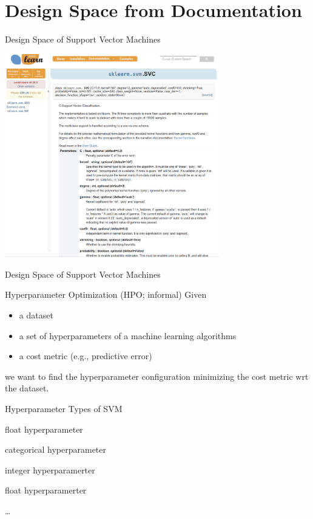 \section{Design Space from Documentation}
\begin{frame}[c]{Design Space of Support Vector Machines}

\centering
\includegraphics[width=0.7\textwidth]{images/sklearn_svm_doc.png}

\end{frame}
\begin{frame}[c]{Design Space of Support Vector Machines}

\begin{block}{Hyperparameter Optimization (HPO; informal)}
Given
\begin{itemize}
  \item a dataset
  \item a set of hyperparameters of a machine learning algorithms
  \item a cost metric (e.g., predictive error)
\end{itemize}
we want to find the hyperparameter configuration minimizing the cost metric wrt the dataset. 
\end{block}

\begin{block}{Hyperparameter Types of SVM}
\begin{description}
  \item[C] float hyperparameter
  \item[Kernel] categorical hyperparameter
  \item[Degree] integer hyperparamerter
  \item[gamma] float hyperparamerter
  \item \ldots
\end{description}
\end{block}

\end{frame}
